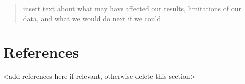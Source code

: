\documentclass[
  12pt,
]{article}
\begin{document}
\begin{quote}
insert text about what may have affected our results, limitations of our
data, and what we would do next if we could
\end{quote}

\newpage

\hypertarget{references}{%
\section{References}\label{references}}

\textless add references here if relevant, otherwise delete this
section\textgreater{}
\end{document}
